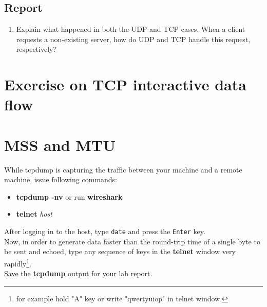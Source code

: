 \documentclass[10pt,a4paper]{article}
\numberwithin{equation}{section}
\numberwithin{figure}{section}
\numberwithin{table}{section}
\begin{document}
    \subsection*{Report}
    \begin{enumerate}
        \item Explain what happened in both the UDP and TCP cases. When a client requests a non-existing server, how do UDP and TCP handle this request, respectively?
    \end{enumerate}

\section*{Exercise on TCP interactive data flow}
\section{MSS and MTU}
While tcpdump is capturing the traffic between your machine and a remote machine, issue following commands:
    \begin{itemize}
        \item \textbf{tcpdump -nv} or run \textbf{wireshark}
        \item \textbf{telnet} \textit{host}
    \end{itemize}
    After logging in to the host, type \texttt{date} and press the \texttt{Enter} key. \\
    Now, in order to generate data faster than the round-trip time of a single byte to be sent and echoed, type any sequence of keys in the \textbf{telnet} window very rapidly\footnote{for example hold "A" key or write "qwertyuiop" in telnet window.}. \\
    \underline{Save} the \textbf{tcpdump} output for your lab report.
\end{document}
